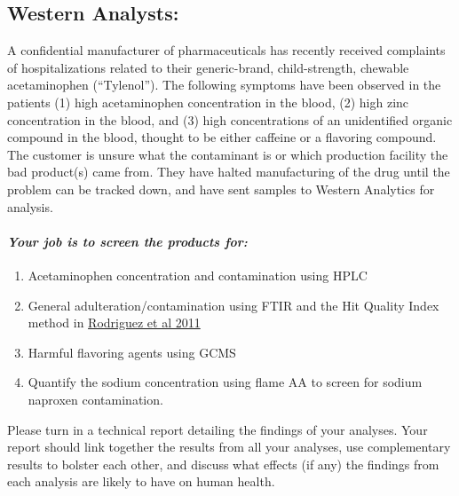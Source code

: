 \documentclass[]{tufte-book}
\providecommand{\tightlist}{%
  \setlength{\itemsep}{0pt}\setlength{\parskip}{0pt}}
\begin{document}
\hypertarget{western-analysts}{%
\subsection*{Western Analysts:}\label{western-analysts}}

A confidential manufacturer of pharmaceuticals has recently received complaints of hospitalizations related to their generic-brand, child-strength, chewable acetaminophen (``Tylenol''). The following symptoms have been observed in the patients (1) high acetaminophen concentration in the blood, (2) high zinc concentration in the blood, and (3) high concentrations of an unidentified organic compound in the blood, thought to be either caffeine or a flavoring compound. The customer is unsure what the contaminant is or which production facility the bad product(s) came from. They have halted manufacturing of the drug until the problem can be tracked down, and have sent samples to Western Analytics for analysis.

\hypertarget{your-job-is-to-screen-the-products-for}{%
\paragraph{\texorpdfstring{\emph{Your job is to screen the products for:}}{Your job is to screen the products for:}}\label{your-job-is-to-screen-the-products-for}}

\begin{enumerate}
\def\labelenumi{\arabic{enumi}.}
\tightlist
\item
  Acetaminophen concentration and contamination using HPLC
\item
  General adulteration/contamination using FTIR and the Hit Quality Index method in \href{https://www.researchgate.net/profile/John_Clarkson6/post/What_are_some_good_reference_bands_for_Raman_spectroscopy/attachment/59d6244c79197b8077982a27/AS\%3A312109580128257\%401451424130311/download/Standardization+of+Raman+spectra+for+transfer+of+spectral+libraries+across+different+instruments.pdf}{Rodriguez et al 2011}
\item
  Harmful flavoring agents using GCMS
\item
  Quantify the sodium concentration using flame AA to screen for sodium naproxen contamination.
\end{enumerate}

Please turn in a technical report detailing the findings of your analyses. Your report should link together the results from all your analyses, use complementary results to bolster each other, and discuss what effects (if any) the findings from each analysis are likely to have on human health.
\end{document}
